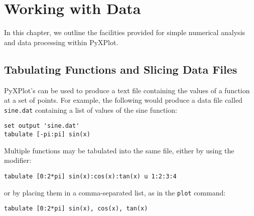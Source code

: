 %
%
%
%
%



\chapter{Working with Data}
\label{ch:numerics}

In this chapter, we outline the facilities provided for simple numerical
analysis and data processing within PyXPlot.

\section{Tabulating Functions and Slicing Data Files}

PyXPlot's  can be used to produce a text file containing the
values of a function at a set of points.  For example, the following would
produce a data file called {\tt sine.dat} containing a list of values of the
sine function:

\begin{verbatim}
set output 'sine.dat'
tabulate [-pi:pi] sin(x)
\end{verbatim}

\noindent Multiple functions may be tabulated into the same file, either by
using the  modifier:

\begin{verbatim}
tabulate [0:2*pi] sin(x):cos(x):tan(x) u 1:2:3:4
\end{verbatim}

\noindent or by placing them in a comma-separated list, as in the {\tt plot}
command:

\begin{verbatim}
tabulate [0:2*pi] sin(x), cos(x), tan(x)
\end{verbatim}

